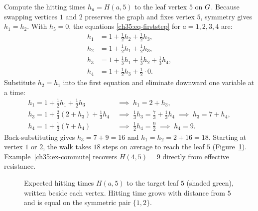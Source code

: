 \begin{example}\label{ch35:ex-hitting}
Compute the hitting times $h_a = H(a,5)$ to the leaf vertex $5$ on $G$. Because swapping vertices $1$ and $2$ preserves the graph and fixes vertex $5$, symmetry gives $h_1=h_2$. With $h_5=0$, the equations \eqref{ch35:eq-firststep} for $a=1,2,3,4$ are:
\begin{align*}
  h_1 &= 1+\tfrac12 h_2+\tfrac12 h_3,\\
  h_2 &= 1+\tfrac12 h_1+\tfrac12 h_3,\\
  h_3 &= 1+\tfrac13 h_1+\tfrac13 h_2+\tfrac13 h_4,\\
  h_4 &= 1+\tfrac12 h_3+\tfrac12\cdot 0.
\end{align*}
Substitute $h_2 = h_1$ into the first equation and eliminate downward one variable at a time:
\begin{align*}
  h_1 = 1 + \tfrac12 h_1 + \tfrac12 h_3 &\;\implies\; h_1 = 2 + h_3, \\
  h_3 = 1 + \tfrac23(2 + h_3) + \tfrac13 h_4 &\;\implies\; \tfrac13 h_3 = \tfrac73 + \tfrac13 h_4 \;\implies\; h_3 = 7 + h_4, \\
  h_4 = 1 + \tfrac12(7 + h_4) &\;\implies\; \tfrac12 h_4 = \tfrac92 \;\implies\; h_4 = 9.
\end{align*}
Back-substituting gives $h_3 = 7 + 9 = 16$ and $h_1 = h_2 = 2 + 16 = 18$. Starting at vertex $1$ or $2$, the walk takes $18$ steps on average to reach the leaf $5$ (Figure~\ref{ch35:fig-hitting}). Example~\ref{ch35:ex-commute} recovers $H(4,5)=9$ directly from effective resistance.

\begin{figure}[htbp]
\centering
{}
\caption{Expected hitting times $H(a,5)$ to the target leaf $5$ (shaded green), written beside each vertex. Hitting time grows with distance from $5$ and is equal on the symmetric pair $\{1,2\}$.}
\label{ch35:fig-hitting}
\end{figure}
\end{example}

